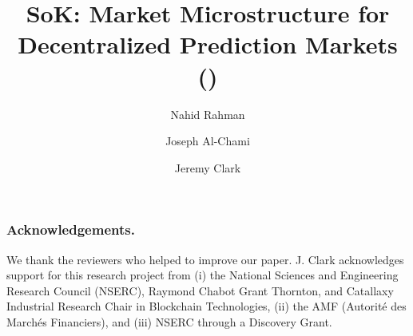 \documentclass[runningheads]{llncs}
\begin{document}
\title{ SoK: Market Microstructure for Decentralized Prediction Markets (\depms)}

\author{
	Nahid Rahman \and 
	Joseph Al-Chami \and 
	Jeremy Clark
	}

	

\maketitle









\subsubsection*{Acknowledgements.} We thank the reviewers who helped to improve our paper. J. Clark acknowledges support for this research project from (i) the National Sciences and Engineering Research Council (NSERC), Raymond Chabot Grant Thornton, and Catallaxy Industrial Research Chair in Blockchain Technologies, (ii) the AMF (Autorité des Marchés Financiers), and (iii) NSERC through a Discovery Grant. 





\clearpage
\appendix
%

\end{document}
